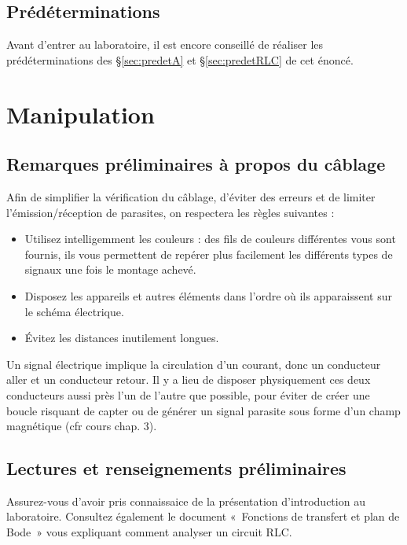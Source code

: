 \documentclass{../template/labo}
\begin{document}
\subsection{Prédéterminations} %
Avant d'entrer au laboratoire, il est encore conseillé de réaliser les prédéterminations des §\ref{sec:predetA} et §\ref{sec:predetRLC} de cet énoncé.

\section{Manipulation}
\subsection{Remarques préliminaires à propos du câblage}
Afin de simplifier la vérification du câblage, d'éviter des erreurs et de limiter l'émission/réception de parasites, on
respectera les règles suivantes :
\begin{itemize}
\item Utilisez intelligemment les couleurs : des fils de couleurs différentes vous sont fournis, ils vous permettent de
repérer plus facilement les différents types de signaux une fois le montage achevé.
\item Disposez les appareils et autres éléments dans l'ordre où ils apparaissent sur le schéma électrique.
\item Évitez les distances inutilement longues.
\end{itemize}
Un signal électrique implique la circulation d'un courant, donc un conducteur aller et un conducteur retour. Il y a lieu
de disposer physiquement ces deux conducteurs aussi près l'un de l'autre que possible, pour éviter de créer une boucle
risquant de capter ou de générer un signal parasite sous forme d'un champ magnétique (cfr cours chap. 3).

\subsection{Lectures et renseignements préliminaires}

Assurez-vous d'avoir pris connaissaice de la présentation d'introduction au laboratoire.
Consultez également le document «~Fonctions de transfert et plan de Bode~» vous expliquant comment analyser un circuit RLC.
\end{document}
